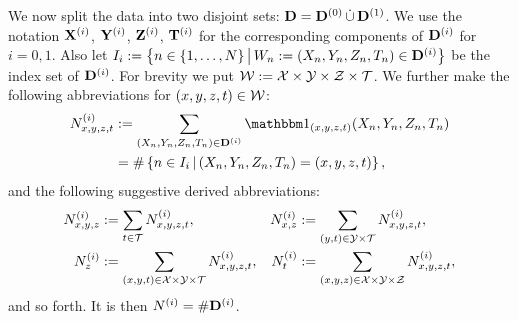 We now split the data into two disjoint sets: $\mathbf{D} = \mathbf{D}^{(0)} \,\dot{\cup}\, \mathbf{D}^{(1)}$. 
We use the notation $\mathbf{X}^{(i)}$, $\mathbf{Y}^{(i)}$, $\mathbf{Z}^{(i)}$, $\mathbf{T}^{(i)}$ for the corresponding components of $\mathbf{D}^{(i)}$ for $i=0,1$.
Also let $I_i:=\left \{ n \in \left \{ 1,\dots,N \right \} \,\middle|\, W_n:= (X_n,Y_n,Z_n,T_n) \in \mathbf{D}^{(i)} \right \}$ be the index set of $\mathbf{D}^{(i)}$.
For brevity we put $\mathcal{W}:=\mathcal{X}\times\mathcal{Y}\times\mathcal{Z}\times\mathcal{T}$.
We further make the following abbreviations for $(x,y,z,t) \in \mathcal{W}$:
\begin{align*}
    N^{(i)}_{x,y,z,t} &:=  \sum_{(X_n,Y_n,Z_n,T_n) \in \Dbf^{(i)}} \I_{(x,y,z,t)}(X_n,Y_n,Z_n,T_n) \\ 
    &= \#\lC n \in I_i \st (X_n,Y_n,Z_n,T_n) = (x,y,z,t) \rC,
\end{align*}
and the following suggestive derived abbreviations:
\begin{align*}
    N^{(i)}_{x,y,z} &:=  \sum_{t \in \mathcal{T}} N^{(i)}_{x,y,z,t}, &
    N^{(i)}_{x,z} &:=  \sum_{(y,t) \in \mathcal{Y}\times\mathcal{T}} N^{(i)}_{x,y,z,t},\\
    N^{(i)}_{z} &:=  \sum_{(x,y,t) \in \mathcal{X}\times\mathcal{Y}\times\mathcal{T}} N^{(i)}_{x,y,z,t},&
    N^{(i)}_{t} &:=  \sum_{(x,y,z) \in \mathcal{X}\times\mathcal{Y}\times\mathcal{Z}} N^{(i)}_{x,y,z,t},
\end{align*}
and so forth. It is then $N^{(i)} = \#\mathbf{D}^{(i)}$.

